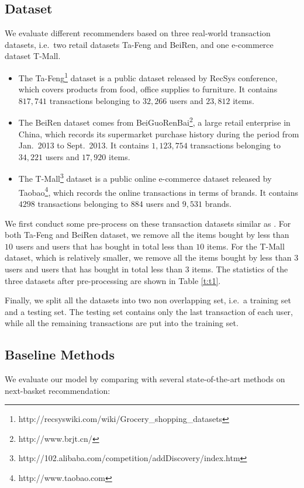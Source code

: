 \documentclass[10pt,journal,compsoc]{IEEEtran}
\begin{document}
\subsection{Dataset}
We evaluate different recommenders based on three real-world transaction datasets, i.e.~two retail datasets Ta-Feng and BeiRen, and one e-commerce dataset T-Mall.

\begin{itemize}
\item The Ta-Feng\footnote{http://recsyswiki.com/wiki/Grocery\_shopping\_datasets} dataset is a public dataset released by RecSys conference, which covers products from food, office supplies to furniture. It contains $817,741$ transactions belonging to $32,266$ users and $23,812$ items.
\item The BeiRen dataset comes from BeiGuoRenBai\footnote{http://www.brjt.cn/}, a large retail enterprise in China, which records its supermarket purchase history during the period from Jan.~2013 to Sept.~2013. It contains $1,123,754$ transactions belonging to $34,221$ users and $17,920$ items.
\item The T-Mall\footnote{http://102.alibaba.com/competition/addDiscovery/index.htm} dataset is a public online e-commerce dataset released by Taobao\footnote{http://www.taobao.com}, which records the online transactions in terms of brands. It contains $4298$ transactions belonging to $884$ users and $9,531$ brands.
\end{itemize}

We first conduct some pre-process on these transaction datasets similar as \cite{fpmc}. For both Ta-Feng and BeiRen dataset, we remove all the items bought by less than $10$ users and users that has bought in total less than $10$ items. For the T-Mall dataset, which is relatively smaller, we remove all the items bought by less than $3$ users and users that has bought in total less than $3$ items. The statistics of the three datasets after pre-processing are shown in Table \ref{t:t1}.

Finally, we split all the datasets into two non overlapping set, i.e.~a training set and a testing set. The testing set contains only the last transaction of each user, while all the remaining transactions are put into the training set.

\subsection{Baseline Methods}
We evaluate our model by comparing with several state-of-the-art methods on next-basket recommendation:
\end{document}
